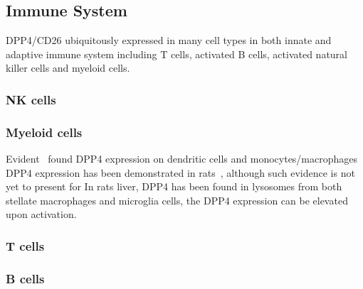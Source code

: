 \subsection{Immune System}
DPP4/CD26 ubiquitously expressed in many cell types in both innate and adaptive immune system including T cells, activated B cells, activated natural killer cells and myeloid cells.~\cite{Abbott1994,Shingu2003,Hong1989,Gutschmidt1981,Dikov2004,Bühling1995,Tanaka1992,Gorrell1991}  

\subsubsection{NK cells}

\subsubsection{Myeloid cells}
Evident~\cite{Zhong2013,Gliddon2002} found DPP4 expression on dendritic cells and monocytes/macrophages DPP4 expression has been demonstrated in rats~\cite{Epardaud2004, Ellingsen2007}, although such evidence is not yet to present for  In rats liver, DPP4 has been found in lysosomes from both stellate macrophages and microglia cells, the DPP4 expression can be elevated upon activation.~\cite{Fukui1990} 

\subsubsection{T cells}
\subsubsection{B cells}
